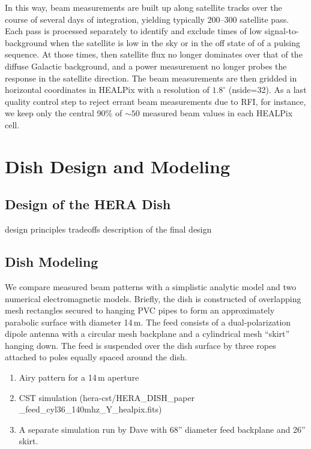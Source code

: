 \documentclass{emulateapj}
\begin{document}
In this way, beam measurements are built up along satellite tracks over the course of 
several days of integration, yielding typically 200--300 satellite pass. Each pass is 
processed separately to identify and exclude times of low signal-to-background when the 
satellite is low in the sky or in the off state of of a pulsing sequence. At those times, then 
satellite flux no longer dominates over that of the diffuse Galactic background, and a 
power measurement no longer probes the response in the satellite direction. The beam 
measurements are then gridded in horizontal coordinates in HEALPix with a resolution of 
$1.8^\circ$ (nside=32). As a last quality control step to reject errant beam measurements 
due to RFI, for instance, we keep only the central 90\% of $\sim50$ measured beam 
values in each HEALPix cell.


\section{Dish Design and Modeling}

\subsection{Design of the HERA Dish}

design principles
tradeoffs
description of the final design

\subsection{Dish Modeling}
\label{sec:dishmodels}

We compare measured beam patterns with a simplistic analytic model and two numerical electromagnetic models. Briefly, the dish is constructed of overlapping mesh rectangles secured to hanging PVC pipes to form an approximately parabolic surface with diameter 14\,m. The feed consists of a dual-polarization dipole antenna with a circular mesh backplane and a cylindrical mesh ``skirt'' hanging down. The feed is suspended over the dish surface by three ropes attached to poles equally spaced around the dish.

\begin{enumerate}
	\item Airy pattern for a 14\,m aperture
	\item CST simulation (hera-cst/HERA\_DISH\_paper \_feed\_cyl36\_140mhz\_Y\_healpix.fits)
	\item A separate simulation run by Dave with 68'' diameter feed backplane and 26'' skirt.
\end{enumerate}
\end{document}
